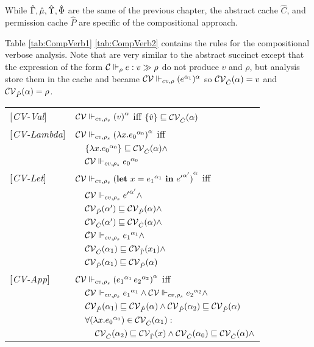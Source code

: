 While $\hat{\Gamma}, \hat{\mu},  \hat{\Upsilon}, \hat{\Phi}$ are the same of the previous chapter, the abstract cache $\hat{C}$, and permission cache $\hat{P}$ are specific of the compositional approach.

Table \ref{tab:CompVerb1} \ref{tab:CompVerb2} contains the rules for the compositional verbose analysis. Note that are very similar to the abstract succinct except that the expression of the form ${\cal C} \Vdash_\rho e : v \gg \rho$ do not produce $v$ and $\rho$, but analysis store them in the cache and became $\mathcal{CV} \Vdash_{cv,\rho} (e^{\alpha_1})^\alpha$ so $\mathcal{CV}_{\hat{C}}(\alpha) = v$ and $\mathcal{CV}_{\hat{P}}(\alpha) = \rho$.

\begin{table}[htb]
\begin{tabular}{l l l l}
{[\textit{CV-Val}]}&\multicolumn{3}{l}{$ \mathcal{CV} \Vdash_{cv, \rho_s} {(v)}^{\alpha} $ iff $\{\hat{v}\} \sqsubseteq \mathcal{CV}_{\hat{C}}(\alpha)$} \\ 
{[\textit{CV-Lambda}]}&\multicolumn{3}{l}{$ \mathcal{CV} \Vdash_{cv, \rho_s} {(\lambda x.{e_0}^{\alpha_0})}^{\alpha} $ iff}\\
&&\multicolumn{2}{l}{$\{\lambda x.{e_0}^{\alpha_0}\} \sqsubseteq \mathcal{CV}_{\hat{C}}(\alpha) \wedge $}\\
&&\multicolumn{2}{l}{$ \mathcal{CV} \Vdash_{cv, \rho_s} {e_0}^{\alpha_0}$}\\
{[\textit{CV-Let}]}&\multicolumn{3}{l}{$ \mathcal{CV} \Vdash_{cv, \rho_s} {(\mathbf{let}\ x = {e_1}^{\alpha_1}\ \mathbf{in}\ {e'}^{\alpha'})}^{\alpha}$ iff}\\
&&\multicolumn{2}{l}{$ \mathcal{CV} \Vdash_{cv, \rho_s} {e'}^{\alpha'} \wedge$} \\
&&\multicolumn{2}{l}{$ \mathcal{CV}_{\hat{P}}(\alpha') \sqsubseteq \mathcal{CV}_{\hat{P}}(\alpha) \wedge$}\\
&&\multicolumn{2}{l}{$ \mathcal{CV}_{\hat{C}}(\alpha') \sqsubseteq \mathcal{CV}_{\hat{C}}(\alpha) \wedge$}\\
&&\multicolumn{2}{l}{$\mathcal{CV} \Vdash_{cv, \rho_s} {e_1}^{\alpha_1} \wedge$}\\
&&\multicolumn{2}{l}{ $ \mathcal{CV}_{\hat{C}}(\alpha_1) \sqsubseteq \mathcal{CV}_{\hat{\Gamma}}(x_1) \wedge$} \\
&&\multicolumn{2}{l}{ $ \mathcal{CV}_{\hat{P}}(\alpha_1) \sqsubseteq \mathcal{CV}_{\hat{P}}(\alpha) $ }\\
{[\textit{CV-App}]}&\multicolumn{3}{l}{$ \mathcal{CV} \Vdash_{cv, \rho_s} {({e_1}^{\alpha_1}\, {e_2}^{\alpha_2})}^{\alpha}$ iff}\\
&&\multicolumn{2}{l}{$\mathcal{CV} \Vdash_{cv, \rho_s} {e_1}^{\alpha_1} \wedge \mathcal{CV} \Vdash_{cv, \rho_s} {e_2}^{\alpha_2} \wedge$} \\
&&\multicolumn{2}{l}{$\mathcal{CV}_{\hat{P}}(\alpha_1) \sqsubseteq \mathcal{CV}_{\hat{P}}(\alpha) \wedge \mathcal{CV}_{\hat{P}}(\alpha_2) \sqsubseteq \mathcal{CV}_{\hat{P}}(\alpha)$} \\
&&\multicolumn{2}{l}{$\forall (\lambda x.{e_0}^{\alpha_0}) \in \mathcal{CV}_{\hat{C}}(\alpha_1) :$}\\
&&&$\mathcal{CV}_{\hat{C}}(\alpha_2) \sqsubseteq \mathcal{CV}_{\hat{\Gamma}}(x) \wedge \mathcal{CV}_{\hat{C}}(\alpha_0) \sqsubseteq \mathcal{CV}_{\hat{C}}(\alpha) \wedge$\\

\end{tabular}
\end{table}
